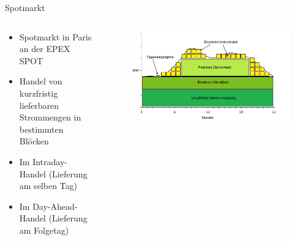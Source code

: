 \documentclass[aspectratio=1610, professionalfonts, 9pt]{beamer}
\begin{document}
\begin{frame}{Spotmarkt}
  \begin{columns}
  \begin{column}{0.3\textwidth}
  \begin{itemize}
    \item Spotmarkt in Paris an der EPEX SPOT
    \item Handel von kurzfristig lieferbaren Strommengen in bestimmten Blöcken
    \item Im Intraday-Handel (Lieferung am selben Tag)
    \item Im Day-Ahead-Handel (Lieferung am Folgetag)
  \end{itemize}
  \end{column}
  \begin{column}{0.7\textwidth}
  \begin{figure}
  \includegraphics[width=1\textwidth]{images/Stromborse_stromverbrauch_lastprofil.png}
  \end{figure}
\end{column}
\end{columns}
\end{frame}
\end{document}
